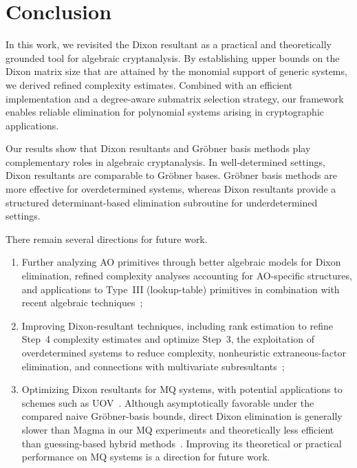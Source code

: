 \section{Conclusion}
\label{Section:Conclusion}

In this work, we revisited the Dixon resultant as a practical and theoretically grounded tool for algebraic cryptanalysis. By establishing upper bounds on the Dixon matrix size that are attained by the monomial support of generic systems, we derived refined complexity estimates. Combined with an efficient implementation and a degree-aware submatrix selection strategy, our framework enables reliable elimination for polynomial systems arising in cryptographic applications.

Our results show that Dixon resultants and Gr\"obner basis methods play complementary roles in algebraic cryptanalysis. In well-determined settings, Dixon resultants are comparable to Gr\"obner bases. Gr\"obner basis methods are more effective for overdetermined systems, whereas Dixon resultants provide a structured determinant-based elimination subroutine for underdetermined settings. 

There remain several directions for future work.
\begin{enumerate}%
	\item Further analyzing AO primitives through better algebraic models for Dixon elimination, refined complexity analyses accounting for AO-specific structures, and applications to Type~III (lookup-table) primitives in combination with recent algebraic techniques~\cite{DBLP:journals/tosc/BakJGP25};

    \item Improving Dixon-resultant techniques, including rank estimation to refine Step~4 complexity estimates and optimize Step~3, the exploitation of overdetermined systems to reduce complexity, nonheuristic extraneous-factor elimination, and connections with multivariate subresultants~\cite{DBLP:journals/moc/CoxD23};
	
	\item Optimizing Dixon resultants for MQ systems, with potential applications to schemes such as UOV~\cite{DBLP:conf/eurocrypt/KipnisPG99}. Although asymptotically favorable under the compared naive Gr\"obner-basis bounds, direct Dixon elimination is generally slower than Magma in our MQ experiments and theoretically less efficient than guessing-based hybrid methods~\cite{DBLP:journals/jmc/BettaleFP09}. Improving its theoretical or practical performance on MQ systems is a direction for future work.
\end{enumerate}
